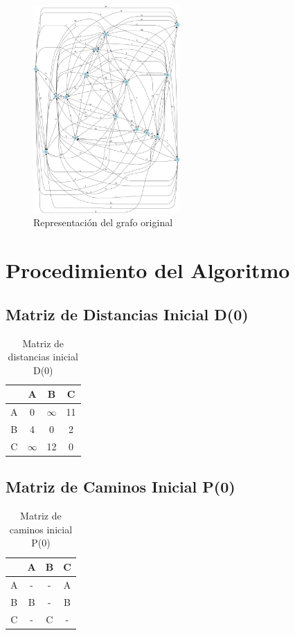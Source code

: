 \documentclass[12pt]{article}
\begin{document}
\begin{figure}[h!]
\centering
\includegraphics[width=0.5\textwidth,keepaspectratio]{grafo.png}
\caption{Representación del grafo original}
\end{figure}

\clearpage
\section{Procedimiento del Algoritmo}
\subsection{Matriz de Distancias Inicial D(0)}
\begin{table}[h!]
\centering
\begin{tabular}{|c|c|c|c|}
\hline
 & A & B & C \\\hline
A & 0 & $\infty$ & 11 \\\hline
B & 4 & 0 & 2 \\\hline
C & $\infty$ & 12 & 0 \\\hline
\end{tabular}
\caption{Matriz de distancias inicial D(0)}
\end{table}

\clearpage
\subsection{Matriz de Caminos Inicial P(0)}
\begin{table}[h!]
\centering
\begin{tabular}{|c|c|c|c|}
\hline
 & A & B & C \\\hline
A & - & - & A \\\hline
B & B & - & B \\\hline
C & - & C & - \\\hline
\end{tabular}
\caption{Matriz de caminos inicial P(0)}
\end{table}
\end{document}
